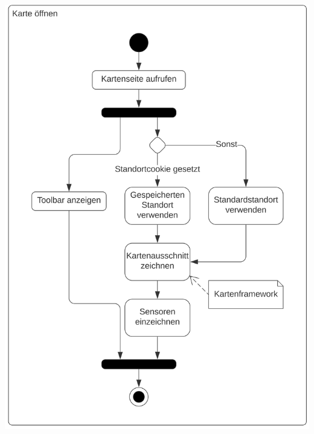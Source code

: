 \begin{center}
\clearpage

\includegraphics[scale=0.19]{media/activity-usage/KarteOeffnen} 

\clearpage


\end{center}
